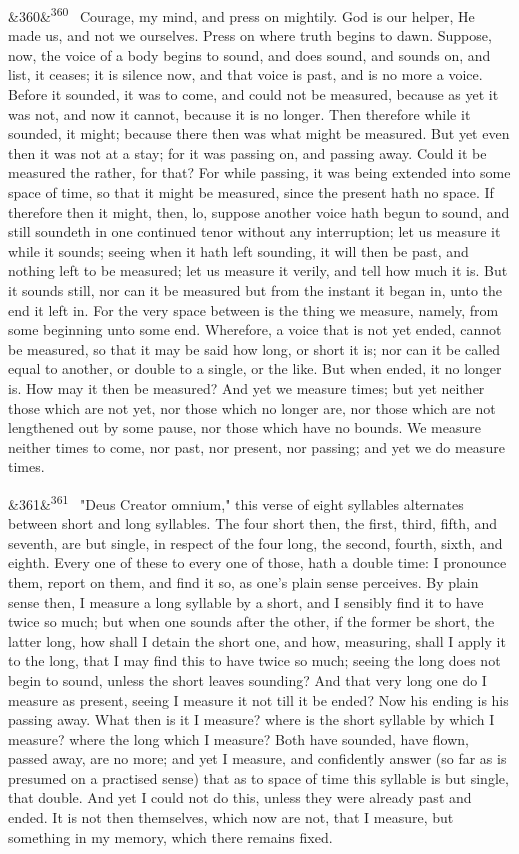\documentclass[12pt]{article}
\newcommand{\para}[1][]{\par\noindent\ifx&#1&\else\textsuperscript{\footnotesize #1}~\fi}
\begin{document}
\para[360] Courage, my mind, and press on mightily. God is our helper, He made us, and not we ourselves. Press on where truth begins to dawn. Suppose, now, the voice of a body begins to sound, and does sound, and sounds on, and list, it ceases; it is silence now, and that voice is past, and is no more a voice. Before it sounded, it was to come, and could not be measured, because as yet it was not, and now it cannot, because it is no longer. Then therefore while it sounded, it might; because there then was what might be measured. But yet even then it was not at a stay; for it was passing on, and passing away. Could it be measured the rather, for that? For while passing, it was being extended into some space of time, so that it might be measured, since the present hath no space. If therefore then it might, then, lo, suppose another voice hath begun to sound, and still soundeth in one continued tenor without any interruption; let us measure it while it sounds; seeing when it hath left sounding, it will then be past, and nothing left to be measured; let us measure it verily, and tell how much it is. But it sounds still, nor can it be measured but from the instant it began in, unto the end it left in. For the very space between is the thing we measure, namely, from some beginning unto some end. Wherefore, a voice that is not yet ended, cannot be measured, so that it may be said how long, or short it is; nor can it be called equal to another, or double to a single, or the like. But when ended, it no longer is. How may it then be measured? And yet we measure times; but yet neither those which are not yet, nor those which no longer are, nor those which are not lengthened out by some pause, nor those which have no bounds. We measure neither times to come, nor past, nor present, nor passing; and yet we do measure times.

\para[361] "Deus Creator omnium," this verse of eight syllables alternates between short and long syllables. The four short then, the first, third, fifth, and seventh, are but single, in respect of the four long, the second, fourth, sixth, and eighth. Every one of these to every one of those, hath a double time: I pronounce them, report on them, and find it so, as one's plain sense perceives. By plain sense then, I measure a long syllable by a short, and I sensibly find it to have twice so much; but when one sounds after the other, if the former be short, the latter long, how shall I detain the short one, and how, measuring, shall I apply it to the long, that I may find this to have twice so much; seeing the long does not begin to sound, unless the short leaves sounding? And that very long one do I measure as present, seeing I measure it not till it be ended? Now his ending is his passing away. What then is it I measure? where is the short syllable by which I measure? where the long which I measure? Both have sounded, have flown, passed away, are no more; and yet I measure, and confidently answer (so far as is presumed on a practised sense) that as to space of time this syllable is but single, that double. And yet I could not do this, unless they were already past and ended. It is not then themselves, which now are not, that I measure, but something in my memory, which there remains fixed.
\end{document}
